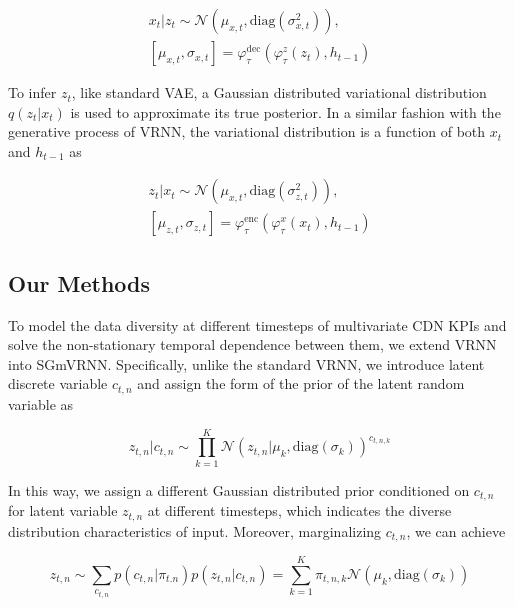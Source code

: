 \documentclass[a0,portrait]{a0poster}
\begin{document}
\begin{multicols}{2}
\begin{equation}
	\begin{gathered}
		x_t | z_t \sim \mathcal{N}\left(\mu_{x,t}, \text{diag}(\sigma_{x,t}^{2})\right), \\
		\left[ \mu_{x,t} , \sigma_{x,t} \right] = \varphi_{\tau}^\text{dec} \left( \varphi_\tau^{z}(z_t),h_{t-1}\right)
	\end{gathered}
\end{equation}

To infer $z_t$, like standard VAE, a Gaussian distributed variational distribution $q(z_t|x_t)$ is used to approximate its true posterior. In a similar fashion with the generative process of VRNN, the variational distribution is a function of both $x_t$ and $h_{t-1}$ as

\begin{equation}
	\begin{gathered}
		z_t | x_t \sim \mathcal{N}\left(\mu_{x,t}, \text{diag}(\sigma_{z,t}^{2})\right), \\
		\left[ \mu_{z,t} , \sigma_{z,t} \right] = \varphi_{\tau}^\text{enc} \left( \varphi_\tau^{x}(x_t),h_{t-1}\right)
	\end{gathered}
\end{equation}


\subsection*{Our Methods}

\quad To model the data diversity at different timesteps of multivariate CDN KPIs and solve the non-stationary temporal dependence between them, we extend VRNN into SGmVRNN. Specifically, unlike the standard VRNN, we introduce latent discrete variable $c_{t,n}$ and assign the form of the prior of the latent random variable as

\begin{equation}
	z_{t,n} |c_{t,n} \sim \prod_{k=1}^{K} \mathcal{N}\left(z_{t,n} | \mu_k, \text{diag}(\sigma_{k})\right)^{c_{t,n,k}}
\end{equation}

In this way, we assign a different Gaussian distributed prior conditioned on $c_{t,n}$ for latent variable $z_{t,n}$ at different timesteps, which indicates the diverse distribution characteristics of input. Moreover, marginalizing $c_{t,n}$, we can achieve

\begin{equation}
	z_{t,n} \sim \sum_{c_{t,n}} p\left(c_{t,n}|\pi_{t.n}\right) p\left(z_{t,n} | c_{t,n}\right) = \sum_{k=1}^K \pi_{t,n,k} \mathcal{N}\left(\mu_k, \text{diag}(\sigma_{k})\right)
\end{equation}


\end{multicols}
\end{document}
